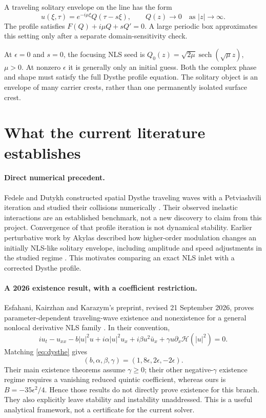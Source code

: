 \documentclass[11pt]{article}
\DeclareMathOperator{\sech}{sech}
\begin{document}
\begin{definition}
A traveling solitary envelope on the line has the form
\begin{equation}\label{eq:travel}
u(\xi,\tau)=e^{-i\mu\xi}Q(\tau-s\xi),\qquad Q(z)\longrightarrow0
\quad\text{as }|z|\longrightarrow\infty.
\end{equation}
The profile satisfies $F(Q)+i\mu Q+sQ'=0$. A large periodic box approximates
this setting only after a separate domain-sensitivity check.
\end{definition}

At $\epsilon=0$ and $s=0$, the focusing NLS seed is
$Q_0(z)=\sqrt{2\mu}\sech(\sqrt\mu z)$, $\mu>0$. At nonzero $\epsilon$ it is
generally only an initial guess. Both the complex phase and shape must satisfy
the full Dysthe profile equation. The solitary object is an envelope of many
carrier crests, rather than one permanently isolated surface crest.

\newpage
\section{What the current literature establishes}
\paragraph{Direct numerical precedent.}
Fedele and Dutykh constructed spatial Dysthe traveling waves with a
Petviashvili iteration and studied their collisions numerically
\cite{fd}. Their observed inelastic interactions are an established benchmark,
not a new discovery to claim from this project. Convergence of that profile
iteration is not dynamical stability. Earlier perturbative work by Akylas
described how higher-order modulation changes an initially NLS-like solitary
envelope, including amplitude and speed adjustments in the studied regime
\cite{akylas}. This motivates comparing an exact NLS inlet with a corrected
Dysthe profile.

\paragraph{A 2026 existence result, with a coefficient restriction.}
Esfahani, Kairzhan and Karazym's preprint, revised 21 September 2026, proves
parameter-dependent traveling-wave existence and nonexistence for a general
nonlocal derivative NLS family \cite{ekk}. In their convention,
\[
iu_t-u_{xx}-b|u|^2u+i\alpha|u|^2u_x+i\beta u^2\bar u_x
 +\gamma u\partial_x\mathcal H(|u|^2)=0.
\]
Matching \eqref{eq:dysthe} gives
\[
(b,\alpha,\beta,\gamma)=(1,8\epsilon,2\epsilon,-2\epsilon).
\]
Their main existence theorems assume $\gamma\geq0$; their other negative-$\gamma$
existence regime requires a vanishing reduced quintic coefficient, whereas ours
is $B=-35\epsilon^2/4$. Hence those results do not directly prove existence for
this branch. They also explicitly leave stability and instability unaddressed.
This is a useful analytical framework, not a certificate for the current solver.
\end{document}

